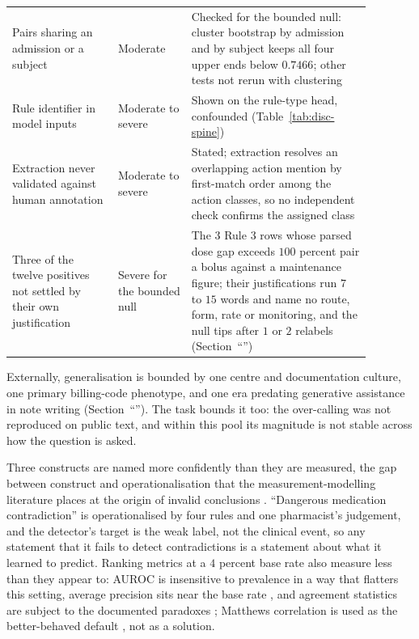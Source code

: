 \begin{longtable}{@{}>{\tblragged}p{0.26\linewidth}>{\tblragged}p{0.18\linewidth}>{\tblragged}p{0.44\linewidth}@{}}
\addlinespace
Pairs sharing an admission or a subject & Moderate & Checked for the bounded null: cluster bootstrap by admission and by subject keeps all four upper ends below $0.7466$; other tests not rerun with clustering \\
\addlinespace
Rule identifier in model inputs & Moderate to severe & Shown on the rule-type head, confounded (Table~\ref{tab:disc-spine}) \\
\addlinespace
Extraction never validated against human annotation & Moderate to severe & Stated; extraction resolves an overlapping action mention by first-match order among the action classes, so no independent check confirms the assigned class \\
\addlinespace
Three of the twelve positives not settled by their own justification & Severe for the bounded null & The $3$ Rule 3 rows whose parsed dose gap exceeds $100$ percent pair a bolus against a maintenance figure; their justifications run $7$ to $15$ words and name no route, form, rate or monitoring, and the null tips after $1$ or $2$ relabels (Section~``\nameref{sec:disc-limits}'') \\
\end{longtable}
\endgroup
{}

Externally, generalisation is bounded by one centre and documentation culture, one primary
billing-code phenotype, and one era predating generative assistance in note writing
(Section~``''). The task bounds it too: the over-calling was not
reproduced on public text, and within this pool its magnitude is not stable across how the
question is asked.

Three constructs are named more confidently than they are measured, the gap
between construct and operationalisation that the measurement-modelling
literature places at the origin of invalid conclusions
\citep{jacobs2021measurement}. ``Dangerous medication contradiction'' is
operationalised by four rules and one pharmacist's judgement, and the detector's
target is the weak label, not the clinical event, so any statement that it fails
to detect contradictions is a statement about what it learned to predict. Ranking
metrics at a $4$ percent base rate also measure less than they appear to: AUROC is
insensitive to prevalence in a way that flatters this setting, average precision
sits near the base rate \citep{saito2015prcurve}, and agreement statistics are
subject to the documented paradoxes
\citep{feinstein1990paradoxes,cicchetti1990resolving,byrt1993pabak}; Matthews
correlation is used as the better-behaved default
\citep{chicco2020mcc,delgado2019kappa}, not as a solution.

